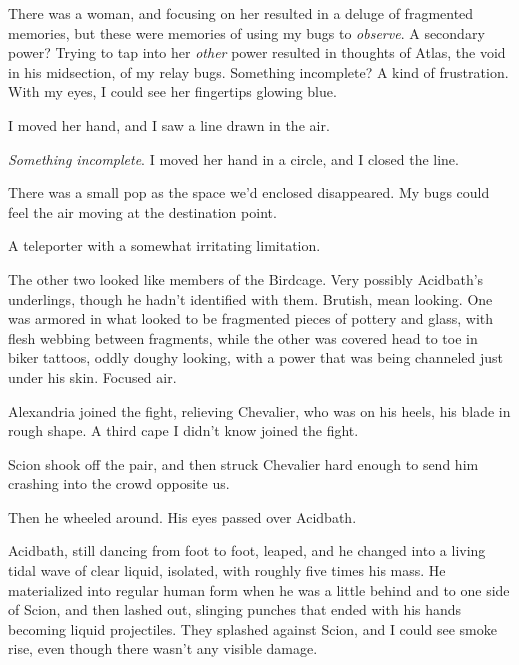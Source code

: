There was a woman, and focusing on her resulted in a deluge of fragmented memories, but these were memories of using my bugs to \emph{observe}.  A secondary power?  Trying to tap into her \emph{other} power resulted in thoughts of Atlas, the void in his midsection, of my relay bugs.  Something incomplete?  A kind of frustration.  With my eyes, I could see her fingertips glowing blue.



I moved her hand, and I saw a line drawn in the air.



\emph{Something incomplete}.  I moved her hand in a circle, and I closed the line.



There was a small pop as the space we'd enclosed disappeared.  My bugs could feel the air moving at the destination point.



A teleporter with a somewhat irritating limitation.



The other two looked like members of the Birdcage.  Very possibly Acidbath's underlings, though he hadn't identified with them.  Brutish, mean looking.  One was armored in what looked to be fragmented pieces of pottery and glass, with flesh webbing between fragments, while the other was covered head to toe in biker tattoos, oddly doughy looking, with a power that was being channeled just under his skin.  Focused air.



Alexandria joined the fight, relieving Chevalier, who was on his heels, his blade in rough shape.  A third cape I didn't know joined the fight.



Scion shook off the pair, and then struck Chevalier hard enough to send him crashing into the crowd opposite us.



Then he wheeled around.  His eyes passed over Acidbath.



Acidbath, still dancing from foot to foot, leaped, and he changed into a living tidal wave of clear liquid, isolated, with roughly five times his mass.  He materialized into regular human form when he was a little behind and to one side of Scion, and then lashed out, slinging punches that ended with his hands becoming liquid projectiles.  They splashed against Scion, and I could see smoke rise, even though there wasn't any visible damage.



